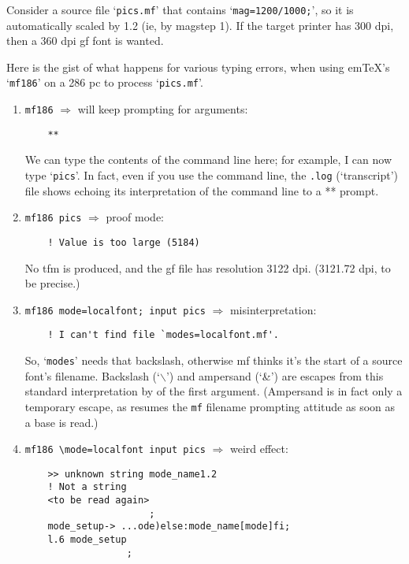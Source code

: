 Consider a source file `{\tt pics.mf}' that contains `{\tt mag=1200/1000;}',
so it is automatically scaled by 1.2 (ie, by magstep 1).  If the target
printer has 300 dpi, then a 360 dpi {\sc gf} font is wanted.

Here is the gist of what happens for various typing errors, when using
em\TeX{}'s `{\tt mf186}' on a 286 {\sc pc} to process `{\tt pics.mf}'.

\begin{enumerate}
\item
\verb+mf186+  $\Longrightarrow$  \MF{} will keep prompting for arguments:
\begin{verbatim}
    **
\end{verbatim}

We can type the contents of the command line here; for example, I can
now type `{\tt pics}'.  In fact, even if you use the command line,
the {\tt .log} (`transcript') file shows \MF{} echoing its
interpretation of the command line to a  **  prompt.

\item  \verb+mf186 pics+  $\Longrightarrow$  proof mode:

\begin{verbatim}
    ! Value is too large (5184)
\end{verbatim}

No {\sc tfm} is produced, and the {\sc gf} file has resolution 3122 dpi.
(3121.72 dpi, to be precise.)

\item  \verb+mf186 mode=localfont; input pics+  $\Longrightarrow$  misinterpretation:
\begin{verbatim}
    ! I can't find file `modes=localfont.mf'.
\end{verbatim}

So, `{\tt modes}' needs that backslash, otherwise mf thinks it's the start
of a source font's filename.  Backslash (`$\backslash$') and ampersand
(`\&') are escapes from this standard interpretation by \MF{}
of the first argument.  (Ampersand is in fact only a temporary escape,
as \MF{} resumes the {\tt mf} filename prompting attitude as soon
as a base is read.)

\item  \verb+mf186 \mode=localfont input pics+  $\Longrightarrow$
  weird effect:
\begin{verbatim}
    >> unknown string mode_name1.2
    ! Not a string
    <to be read again>
                      ;
    mode_setup-> ...ode)else:mode_name[mode]fi;
    l.6 mode_setup
                  ;
\end{verbatim}


\end{enumerate}
